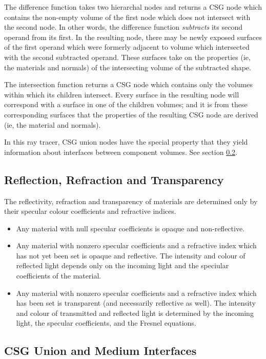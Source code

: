 \documentclass{article}
\begin{document}
The difference function takes two hierarchal nodes and returns a CSG node which
contains the non-empty volume of the first node which does not intersect with
the second node. In other words, the difference function \emph{subtracts} its
second operand from its first. In the resulting node, there may be newly exposed
surfaces of the first operand which were formerly adjacent to volume which
intersected with the second subtracted operand. These surfaces take on the
properties (ie, the materials and normals) of the intersecting volume of the
subtracted shape.

The intersection function returns a CSG node which contains only the volumes
within which its children intersect. Every surface in the resulting node will
correspond with a surface in one of the children volumes; and it is from these
corresponding surfaces that the properties of the resulting CSG node are derived
(ie, the material and normals).

In this ray tracer, CSG union nodes have the special property that they yield
information about interfaces between component volumes. See section
\ref{csg_union}.

\subsection{Reflection, Refraction and Transparency}
\label{rrt}

The reflectivity, refraction and transparency of materials are determined only by
their specular colour coefficients and refractive indices.

\begin{itemize}
  \item Any material with null specular coefficients is opaque and non-reflective.
  \item Any material with nonzero specular coefficients and a refractive index
    which has not yet been set is opaque and reflective. The intensity and
    colour of reflected light depends only on the incoming light and the
    speciular coefficients of the material.
  \item Any material with nonzero specular coefficients and a refractive index
    which has been set is transparent (and necessarily reflective as well). The
    intensity and colour of transmitted and reflected light is determined by the
    incoming light, the specular coefficients, and the Fresnel equations.
\end{itemize}

\subsection{CSG Union and Medium Interfaces}
\label{csg_union}
\end{document}
